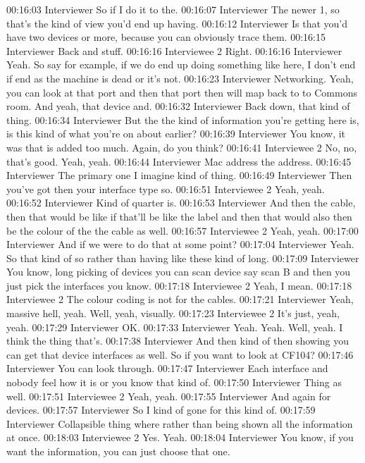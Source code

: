 00:16:03 Interviewer
So if I do it to the.
00:16:07 Interviewer
The newer 1, so that's the kind of view you'd end up having.
00:16:12 Interviewer
Is that you'd have two devices or more, because you can obviously trace them.
00:16:15 Interviewer
Back and stuff.
00:16:16 Interviewee 2 
Right.
00:16:16 Interviewer
Yeah. So say for example, if we do end up doing something like here, I don't end if end as the machine is dead or it's not.
00:16:23 Interviewer
Networking. Yeah, you can look at that port and then that port then will map back to to Commons room. And yeah, that device and.
00:16:32 Interviewer
Back down, that kind of thing.
00:16:34 Interviewer
But the the kind of information you're getting here is, is this kind of what you're on about earlier?
00:16:39 Interviewer
You know, it was that is added too much. Again, do you think?
00:16:41 Interviewee 2 
No, no, that's good. Yeah, yeah.
00:16:44 Interviewer
Mac address the address.
00:16:45 Interviewer
The primary one I imagine kind of thing.
00:16:49 Interviewer
Then you've got then your interface type so.
00:16:51 Interviewee 2 
Yeah, yeah.
00:16:52 Interviewer
Kind of quarter is.
00:16:53 Interviewer
And then the cable, then that would be like if that'll be like the label and then that would also then be the colour of the the cable as well.
00:16:57 Interviewee 2 
Yeah, yeah.
00:17:00 Interviewer
And if we were to do that at some point?
00:17:04 Interviewer
Yeah. So that kind of so rather than having like these kind of long.
00:17:09 Interviewer
You know, long picking of devices you can scan device say scan B and then you just pick the interfaces you know.
00:17:18 Interviewee 2 
Yeah, I mean.
00:17:18 Interviewee 2 
The colour coding is not for the cables.
00:17:21 Interviewer
Yeah, massive hell, yeah. Well, yeah, visually.
00:17:23 Interviewee 2 
It's just, yeah, yeah.
00:17:29 Interviewer
OK.
00:17:33 Interviewer
Yeah. Yeah. Well, yeah. I think the thing that's.
00:17:38 Interviewer
And then kind of then showing you can get that device interfaces as well. So if you want to look at CF104?
00:17:46 Interviewer
You can look through.
00:17:47 Interviewer
Each interface and nobody feel how it is or you know that kind of.
00:17:50 Interviewer
Thing as well.
00:17:51 Interviewee 2 
Yeah, yeah.
00:17:55 Interviewer
And again for devices.
00:17:57 Interviewer
So I kind of gone for this kind of.
00:17:59 Interviewer
Collapsible thing where rather than being shown all the information at once.
00:18:03 Interviewee 2 
Yes. Yeah.
00:18:04 Interviewer
You know, if you want the information, you can just choose that one.
